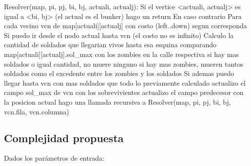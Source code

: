 \begin{codesnippet}
Resolver(map, pi, pj, bi, bj, actuali, actualj):
  Si el vertice <actuali, actualj> es igual a <bi, bj> (el actual es el bunker)
    hago un return
  En caso contrario
    Para cada vecino vcn de map[actuali][actualj] con
        costo (left..down) segun corresponda
    Si puedo ir desde el nodo actual hasta vcn (el costo no es infinito)
    Calculo la cantidad de soldados que llegarian vivos hasta esa esquina
      comparando map[actuali][actualj].sol_max con los zombies en la calle respectiva
      si hay mas soldados o igual cantidad, no muere ninguno
      si hay mas zombies, mueren tantos soldados como el excedente
          entre los zombies y los soldados
    Si ademas puedo llegar hasta vcn con mas soldados que todo lo previamente calculado
      actualizo el campo sol_max de vcn con los sobrevivientes
      actualizo el campo predecesor con la posicion actual
      hago una llamada recursiva a Resolver(map, pi, pj, bi, bj, vcn.fila, vcn.columna)

\end{codesnippet}

\pagebreak

\subsection{Complejidad propuesta}

Dados los parámetros de entrada:

\medskip

